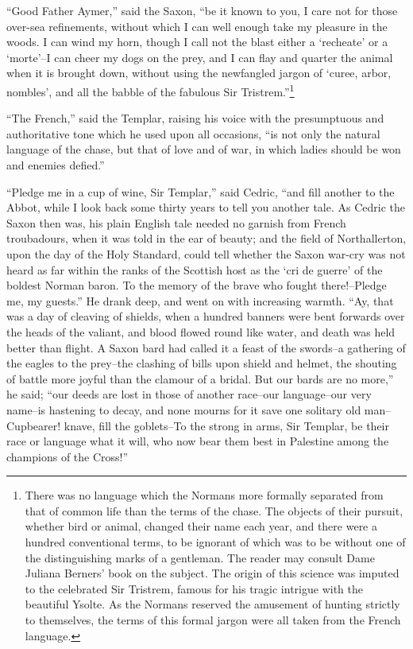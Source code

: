 ``Good Father Aymer,'' said the Saxon, ``be it known to you, I care not
for those over-sea refinements, without which I can well enough take my
pleasure in the woods. I can wind my horn, though I call not the blast
either a `recheate' or a `morte'--I can cheer my dogs on the prey, and I
can flay and quarter the animal when it is brought down, without using
the newfangled jargon of `curee, arbor, nombles', and all the babble of
the fabulous Sir Tristrem.''\footnote{There was no language which the
Normans more formally
separated from that of common life than the terms of the chase. The
objects of their pursuit, whether bird or animal, changed their name
each year, and there were a hundred conventional terms, to be ignorant
of which was to be without one of the distinguishing marks of a
gentleman. The reader may consult Dame Juliana Berners' book on the
subject. The origin of this science was imputed to the celebrated Sir
Tristrem, famous for his tragic intrigue with the beautiful Ysolte. As
the Normans reserved the amusement of hunting strictly to themselves,
the terms of this formal jargon were all taken from the French
language.}

``The French,'' said the Templar, raising his voice with the
presumptuous and authoritative tone which he used upon all occasions,
``is not only the natural language of the chase, but that of love and of
war, in which ladies should be won and enemies defied.''

``Pledge me in a cup of wine, Sir Templar,'' said Cedric, ``and fill
another to the Abbot, while I look back some thirty years to tell you
another tale. As Cedric the Saxon then was, his plain English tale
needed no garnish from French troubadours, when it was told in the ear
of beauty; and the field of Northallerton, upon the day of the Holy
Standard, could tell whether the Saxon war-cry was not heard as far
within the ranks of the Scottish host as the `cri de guerre' of the
boldest Norman baron. To the memory of the brave who fought
there!--Pledge me, my guests.'' He drank deep, and went on with
increasing warmth. ``Ay, that was a day of cleaving of shields, when a
hundred banners were bent forwards over the heads of the valiant, and
blood flowed round like water, and death was held better than flight. A
Saxon bard had called it a feast of the swords--a gathering of the
eagles to the prey--the clashing of bills upon shield and helmet, the
shouting of battle more joyful than the clamour of a bridal. But our
bards are no more,'' he said; ``our deeds are lost in those of another
race--our language--our very name--is hastening to decay, and none
mourns for it save one solitary old man--Cupbearer! knave, fill the
goblets--To the strong in arms, Sir Templar, be their race or language
what it will, who now bear them best in Palestine among the champions of
the Cross!''

